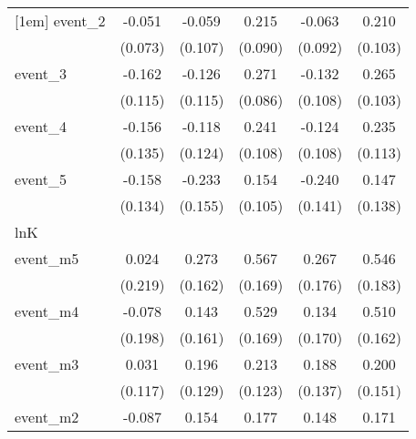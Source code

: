 {\begin{tabular}{l*{5}{c}}
[1em]
event\_2     &      -0.051         &      -0.059         &       0.215\sym{*}  &      -0.063         &       0.210\sym{*}  \\
            &     (0.073)         &     (0.107)         &     (0.090)         &     (0.092)         &     (0.103)         \\
[1em]
event\_3     &      -0.162         &      -0.126         &       0.271\sym{**} &      -0.132         &       0.265\sym{*}  \\
            &     (0.115)         &     (0.115)         &     (0.086)         &     (0.108)         &     (0.103)         \\
[1em]
event\_4     &      -0.156         &      -0.118         &       0.241\sym{*}  &      -0.124         &       0.235\sym{*}  \\
            &     (0.135)         &     (0.124)         &     (0.108)         &     (0.108)         &     (0.113)         \\
[1em]
event\_5     &      -0.158         &      -0.233         &       0.154         &      -0.240         &       0.147         \\
            &     (0.134)         &     (0.155)         &     (0.105)         &     (0.141)         &     (0.138)         \\
\hline
lnK         &                     &                     &                     &                     &                     \\
event\_m5    &       0.024         &       0.273         &       0.567\sym{***}&       0.267         &       0.546\sym{**} \\
            &     (0.219)         &     (0.162)         &     (0.169)         &     (0.176)         &     (0.183)         \\
[1em]
event\_m4    &      -0.078         &       0.143         &       0.529\sym{**} &       0.134         &       0.510\sym{**} \\
            &     (0.198)         &     (0.161)         &     (0.169)         &     (0.170)         &     (0.162)         \\
[1em]
event\_m3    &       0.031         &       0.196         &       0.213         &       0.188         &       0.200         \\
            &     (0.117)         &     (0.129)         &     (0.123)         &     (0.137)         &     (0.151)         \\
[1em]
event\_m2    &      -0.087         &       0.154         &       0.177         &       0.148         &       0.171         \\

\end{tabular}}
